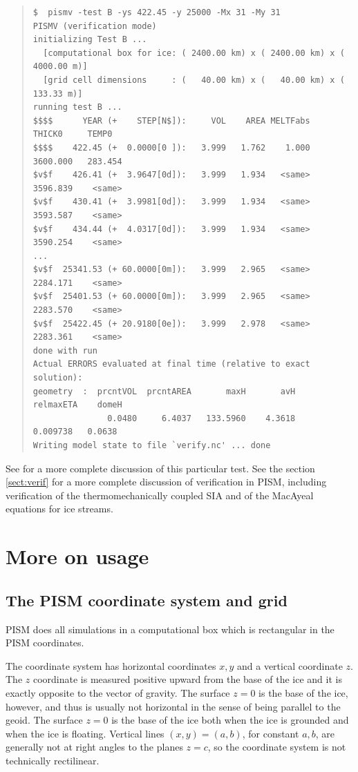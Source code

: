 \documentclass[11pt,final]{amsart}
\begin{document}
\small\begin{quote}\begin{verbatim}
$  pismv -test B -ys 422.45 -y 25000 -Mx 31 -My 31
PISMV (verification mode)
initializing Test B ...
  [computational box for ice: ( 2400.00 km) x ( 2400.00 km) x ( 4000.00 m)]
  [grid cell dimensions     : (   40.00 km) x (   40.00 km) x (  133.33 m)]
running test B ...
$$$$      YEAR (+    STEP[N$]):     VOL    AREA MELTFabs     THICK0     TEMP0
$$$$    422.45 (+  0.0000[0 ]):   3.999   1.762    1.000   3600.000   283.454
$v$f    426.41 (+  3.9647[0d]):   3.999   1.934   <same>   3596.839    <same>
$v$f    430.41 (+  3.9981[0d]):   3.999   1.934   <same>   3593.587    <same>
$v$f    434.44 (+  4.0317[0d]):   3.999   1.934   <same>   3590.254    <same>
...
$v$f  25341.53 (+ 60.0000[0m]):   3.999   2.965   <same>   2284.171    <same>
$v$f  25401.53 (+ 60.0000[0m]):   3.999   2.965   <same>   2283.570    <same>
$v$f  25422.45 (+ 20.9180[0e]):   3.999   2.978   <same>   2283.361    <same>
done with run
Actual ERRORS evaluated at final time (relative to exact solution):
geometry  :  prcntVOL  prcntAREA       maxH       avH   relmaxETA    domeH
               0.0480     6.4037   133.5960    4.3618    0.009738   0.0638
Writing model state to file `verify.nc' ... done
\end{verbatim}
\end{quote}\normalsize

See \cite{BLKCB} for a more complete discussion of this particular test.  See the section \ref{sect:verif} for a more complete discussion of verification in PISM, including verification of the thermomechanically coupled SIA and of the MacAyeal equations for ice streams.


\clearpage
\newpage
\section{More on usage}\label{sect:usage}

\subsection{The PISM coordinate system and grid}  PISM does all simulations in a computational box which is rectangular in the PISM coordinates.

The coordinate system has horizontal coordinates $x,y$ and a vertical coordinate $z$.  The $z$ coordinate is measured positive upward from the base of the ice and it is exactly opposite to the vector of gravity.  The surface $z=0$ is the base of the ice, however, and thus is usually not horizontal in the sense of being parallel to the geoid.   The surface $z=0$ is the base of the ice both when the ice is grounded and when the ice is floating.  Vertical lines $(x,y)=(a,b)$, for constant $a,b$, are generally not at right angles to the planes $z=c$, so the coordinate system is not technically rectilinear.
\end{document}
